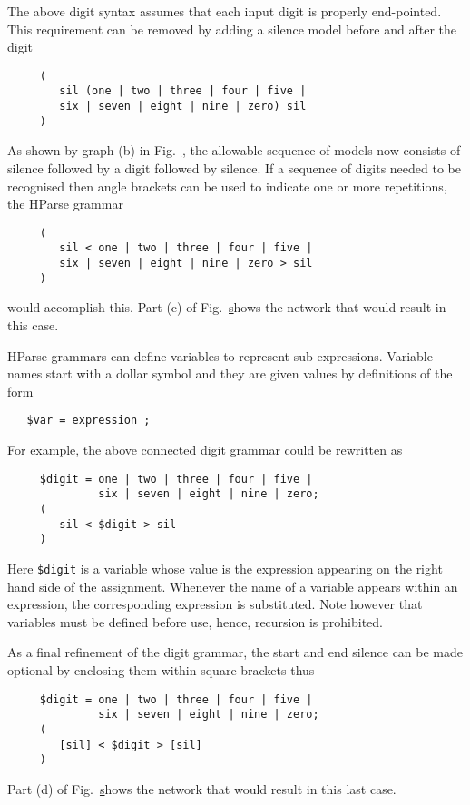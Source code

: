The above digit syntax assumes that each input digit is
properly end-pointed.  This
requirement can be removed by adding a silence model
before and after the digit
\begin{verbatim}
     (
        sil (one | two | three | four | five |
        six | seven | eight | nine | zero) sil
     )
\end{verbatim}
As shown by graph (b) in Fig.~\href{f:digitnets}, the allowable sequence of
models now consists of silence followed by a digit followed by silence. 
If a sequence of digits needed to be recognised then angle brackets can
be used to indicate one or more repetitions, the HParse grammar
\begin{verbatim}
     (
        sil < one | two | three | four | five |
        six | seven | eight | nine | zero > sil
     )
\end{verbatim}
would accomplish this.
Part (c) of Fig.~\href{f:digitnets}
shows the network that would result in this case.


HParse grammars can define 
variables to represent sub-expressions.
Variable names start with a dollar symbol and they are given values
by definitions of the form
\begin{verbatim}
   $var = expression ;
\end{verbatim}
For example, the above connected digit grammar could be rewritten as
\begin{verbatim}
     $digit = one | two | three | four | five |
              six | seven | eight | nine | zero;
     (
        sil < $digit > sil
     )
\end{verbatim}
Here \texttt{\$digit} is a variable whose value is the expression appearing
on the right hand side of the assignment.  Whenever the name of a variable
appears within an expression, the corresponding expression is substituted.
Note however that variables must be defined before use, hence, recursion
is prohibited.

As a final refinement of the digit grammar, the start and end silence
can be made optional by enclosing them within square brackets thus
\begin{verbatim}
     $digit = one | two | three | four | five |
              six | seven | eight | nine | zero;
     (
        [sil] < $digit > [sil]
     )
\end{verbatim}
Part (d) of Fig.~\href{f:digitnets}
shows the network that would result in this last case.

